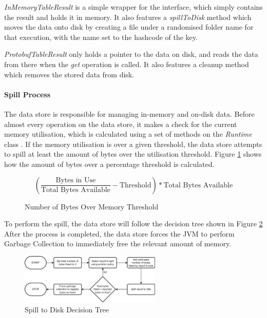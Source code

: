 \textit{InMemoryTableResult} is a simple wrapper for the interface, which simply contains the result and holds it in memory. It also features a \textit{spillToDisk} method which moves the data onto disk by creating a file under a randomised folder name for that execution, with the name set to the hashcode of the key. 

\textit{ProtobufTableResult} only holds a pointer to the data on disk, and reads the data from there when the \textit{get} operation is called. It also features a cleanup method which removes the stored data from disk.

\paragraph{Spill Process}
The data store is responsible for managing in-memory and on-disk data. Before almost every operation on the data store, it makes a check for the current memory utilisation, which is calculated using a set of methods on the \textit{Runtime} class \cite{javaruntimeclass}. If the memory utilisation is over a given threshold, the data store attempts to spill at least the amount of bytes over the utilisation threshold. Figure \ref{fig:bytes-over-memory-threshold} shows how the amount of bytes over a percentage threshold is calculated.

\begin{figure}[h]
	\centering
	\[ \left( \frac{\text{Bytes in Use}}{\text{Total Bytes Available}} - \text{Threshold} \right) * \text{Total Bytes Available} \]
	\caption{Number of Bytes Over Memory Threshold}
	\label{fig:bytes-over-memory-threshold}
\end{figure}

To perform the spill, the data store will follow the decision tree shown in Figure \ref{fig:spill-to-disk-process} After the process is completed, the data store forces the JVM to perform Garbage Collection to immediately free the relevant amount of memory.

\begin{figure}[h]
	\centering
	\includegraphics[width=0.6\textwidth]{chapters/diagrams/implementation/spill-to-disk-process}
	\caption{Spill to Disk Decision Tree}
	\label{fig:spill-to-disk-process}
\end{figure}

